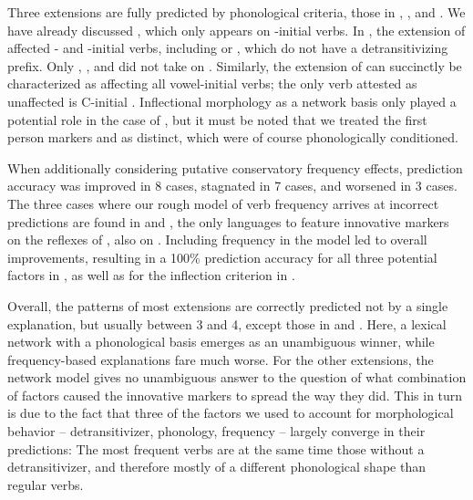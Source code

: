 Three extensions are fully predicted by phonological criteria, those in \akuriyo, \carijo, and \yukpa.
We have already discussed \akuriyo {} , which only appears on -initial verbs.
In \carijo, the extension of  affected - and -initial verbs, including   or  , which do not have a detransitivizing prefix.
Only  ,  , and   did not take on .
Similarly, the extension of \yukpa {} can succinctly be characterized as affecting all vowel-initial verbs; the only verb attested as unaffected is C-initial  .
Inflectional morphology as a network basis only played a potential role in the case of \akuriyo, but it must be noted that we treated the first person markers  and  as distinct, which were of course phonologically conditioned.

When additionally considering putative conservatory frequency effects, prediction accuracy was improved in 8 cases, stagnated in 7 cases, and worsened in 3 cases.
The three cases where our rough model of verb frequency arrives at incorrect predictions are found in \carijo and \yukpa, the only languages to feature innovative markers on the reflexes of  , \yukpa also on  .
Including frequency in the model led to overall improvements, resulting in a 100\% prediction accuracy for all three potential factors in \PTir, as well as for the inflection criterion in \PWai.

Overall, the patterns of most extensions are correctly predicted not by a single explanation, but usually between 3 and 4, except those in \carijo and \yukpa.
Here, a lexical network with a phonological basis emerges as an unambiguous winner, while frequency-based explanations fare much worse.
For the other extensions, the network model gives no unambiguous answer to the question of what combination of factors caused the innovative markers to spread the way they did.
This in turn is due to the fact that three of the factors we used to account for morphological behavior -- detransitivizer, phonology, frequency -- largely converge in their predictions:
The most frequent verbs are at the same time those without a detransitivizer, and therefore mostly of a different phonological shape than regular  verbs.





